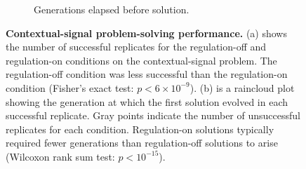 \begin{figure}[ht]
\begin{subfigure}[b]{0.45\textwidth}
    \caption{\small Generations elapsed before solution.}
    \label{chapter:tag-based-regulation:subfig:context-signal-solve-time}
\end{subfigure}

\caption{\small 
\textbf{Contextual-signal problem-solving performance.}
(a) shows the number of successful replicates for the regulation-off and regulation-on conditions on the contextual-signal problem. 
The regulation-off condition was less successful than the regulation-on condition (Fisher's exact test: $p < 6\times10^{-9}$).
(b) is a raincloud plot showing the generation at which the first solution evolved in each successful replicate.
Gray points indicate the number of unsuccessful replicates for each condition.
Regulation-on solutions typically required fewer generations than regulation-off solutions to arise  (Wilcoxon rank sum test: $p < 10^{-15}$).
}

    
\label{chapter:tag-based-regulation:fig:context-signal-performance}
\end{figure}
